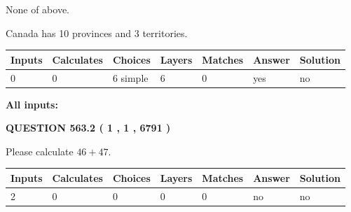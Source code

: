 \documentclass[12pt]{article}
\begin{document}
 
 None of above.
 
 
\noindent{}
 
 
Canada has 10  provinces and 3 territories.
 
 
\noindent{}
 
 
   
   
   
   
\noindent\begin{tabular}{|l|l|l|l|l|l|l|}
 \hline
Inputs & Calculates & Choices & Layers & Matches & Answer & Solution \\ \hline
 0  & 
 0  & 
 6
  simple  
  & 
 6  & 
 0  & 
  yes & 
  no 
  \\ \hline
 \end{tabular}
   
   
   
   
\noindent{}
   
   
   
   
\noindent\vspace{0.1in}\hspace{-0.08in} {\textbf{\Large{All inputs: }}}
   
   
  
\vspace{0.2in}
  
{\textbf{\Large{QUESTION
563.2 
 ( 1 , 1 , 6791 )
}}}
  
  
 
Please calculate $ %
46 +  %
47 $.
 
 
   
   
   
   
\noindent\begin{tabular}{|l|l|l|l|l|l|l|}
 \hline
Inputs & Calculates & Choices & Layers & Matches & Answer & Solution \\ \hline
 2  & 
 0  & 
 0
  & 
 0  & 
 0  & 
  no & 
  no 
  \\ \hline
 \end{tabular}
   
   
   
   
\noindent{}
   
\end{document}
